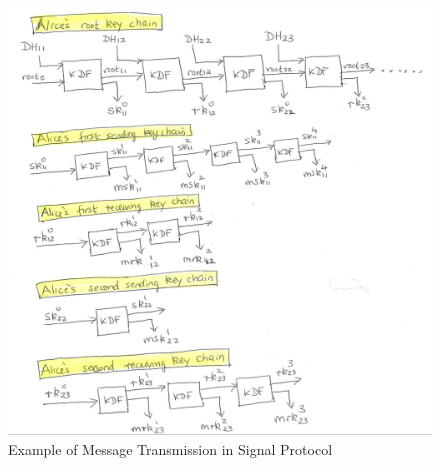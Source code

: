 \documentclass[12pt,titlepage]{article}
\begin{document}
\begin{center}
	\begin{figure}[h!]
		\centering
		\includegraphics[width=\textwidth]{Example_of_Message_Transmission.png}
		\caption{Example of Message Transmission in Signal Protocol}
	\end{figure}
\end{center}
\end{document}
